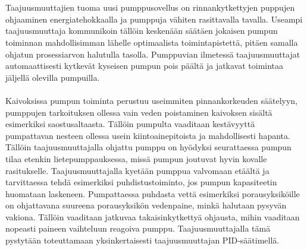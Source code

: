 \documentclass[finnish,12pt,a4paper,pdftex,elec,utf8]{aaltothesis}
\begin{document}
\\\\
Taajuusmuuttajien tuoma uusi pumppusovellus on rinnankytkettyjen puppujen ohjaaminen energiatehokkaalla ja pumppuja vähiten rasittavalla tavalla. Useampi taajuusmuuttaja kommunikoin tällöin keskenään säätäen jokaisen pumpun toiminnan mahdollisimman lähelle optimaalista toimintapistettä, pitäen samalla ohjatun prosessiarvon halutulla tasolla. Pumppuvian ilmetessä taajuusmuuttajat automaattisesti kytkevät kyseisen pumpun pois päältä ja jatkavat toimintaa jäljellä olevilla pumpuilla. \cite{ACQ810} 
\\\\
Kaivoksissa pumpun toiminta perustuu useimmiten pinnankorkeuden säätelyyn, pumppujen tarkoituksen ollessa vain veden poistaminen kaivoksen sisältä esimerkiksi saostusaltaasta. Tällöin pumpulta vaaditaan kestävyyttä pumpattavan nesteen ollessa usein kiintoainepitoista ja mahdollisesti hapanta. Tällöin taajuusmuuttajalla ohjattu pumppu on hyödyksi seurattaessa pumpun tilaa etenkin lietepumppauksessa, missä pumpun joutuvat hyvin kovalle rasitukselle. Taajuusmuuttajalla kyetään pumppua valvomaan etäältä ja tarvittaessa tehdä esimerkiksi puhdistustoiminto, jos pumpun kapasiteetin huomataan laskeneen. Pumpattaessa puhdasta vettä esimerkiksi porausyksiköille on ohjattavana suureena porausyksikön vedenpaine, minkä halutaan pysyvän vakiona. Tällöin vaaditaan jatkuvaa takaisinkytkettyä ohjausta, mihin vaaditaan nopeasti paineen vaihteluun reagoiva pumppu. Taajuusmuuttajalla tämä pystytään toteuttamaan yksinkertaisesti taajuusmuuttajan PID-säätimellä.
\end{document}
